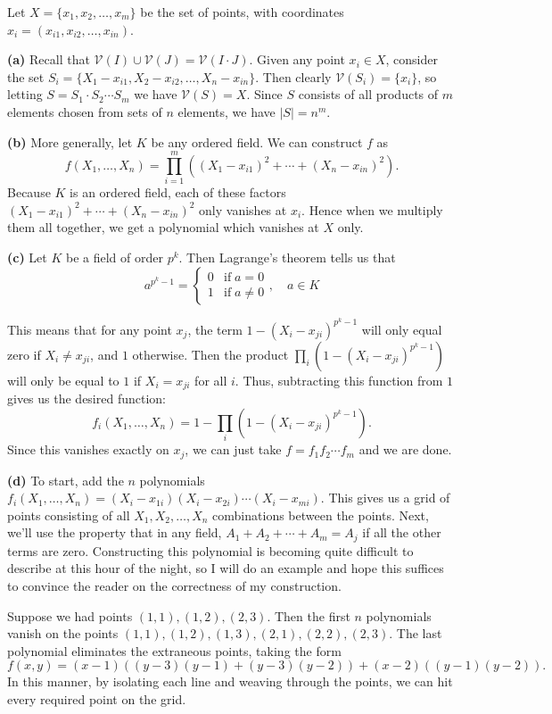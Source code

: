 \documentclass[11pt,letterpaper]{article}
\begin{document}
\begin{changemargin}{1em}{1em}
  Let $X=\{x_1, x_2, \ldots , x_m\}$ be the set of points, with coordinates $x_i = (x_{i1}, x_{i2}, \ldots , x_{in})$.

  \textbf{(a)} Recall that $\mathcal{V}(I)\cup \mathcal{V}(J)=\mathcal{V}(I\cdot J)$. Given any point $x_i\in X$, consider the set $S_i=\{X_1-x_{i 1}, X_2-x_{i 2}, \ldots, X_n - x_{i n}\}$. Then clearly $\mathcal{V}(S_i)=\{x_i\}$, so letting $S=S_1\cdot S_2\cdots S_m$ we have $\mathcal{V}(S)= X$. Since $S$ consists of all products of $m$ elements chosen from sets of $n$ elements, we have $|S|=n^m$.     
  
  \textbf{(b)} More generally, let $K$ be any ordered field. We can construct $f$ as 
  \[
    f(X_1, \ldots , X_n) = \prod\limits_{i=1}^{m}\left((X_1-x_{i1})^2 + \cdots + (X_n - x_{in})^2\right).
  \]  
  Because $K$ is an ordered field, each of these factors $(X_1-x_{i 1})^2+\cdots+(X_n-x_{i n})^2$ only vanishes at $x_i$. Hence when we multiply them all together, we get a polynomial which vanishes at $X$ only.  
  
  \textbf{(c)} Let $K$ be a field of order $p^k$. Then Lagrange's theorem tells us that 
  \[
    a^{p^k-1}=
    \begin{cases}
        0& \mathrm{if}\; a=0\\
        1& \mathrm{if}\; a\neq 0
    \end{cases}
    , \quad a\in K
  \]

  This means that for any point $x_j$, the term $1-(X_i-x_{ji})^{p^k-1}$ will only equal zero if $X_i\neq x_{ji}$, and $1$ otherwise. Then the product $\prod_i (1-(X_i-x_{ji})^{p^k-1})$ will only be equal to $1$ if $X_i=x_{ji}$ for all $i$. Thus, subtracting this function from $1$ gives us the desired function:
  \[
      f_i(X_1, \ldots, X_n) = 1-\prod_i (1-(X_i-x_{ji})^{p^k-1})
  .\]  
  Since this vanishes exactly on $x_j$, we can just take $f=f_1f_2\cdots f_m$ and we are done.  

  \textbf{(d)} To start, add the $n$ polynomials $f_i(X_1, \ldots, X_n)=(X_i-x_{1 i})(X_i-x_{2 i})\cdots (X_i-x_{m i})$. This gives us a grid of points consisting of all $X_1,X_2,\ldots,X_n$ combinations between the points. Next, we'll use the property that in any field, $A_1+A_2+\cdots+A_m=A_j$ if all the other terms are zero. Constructing this polynomial is becoming quite difficult to describe at this hour of the night, so I will do an example and hope this suffices to convince the reader on the correctness of my construction. 
  
  Suppose we had points $(1,1), (1,2), (2,3)$. Then the first $n$ polynomials vanish on the points $(1,1), (1,2), (1,3), (2,1), (2,2), (2,3)$. The last polynomial eliminates the extraneous points, taking the form
  \[
      f(x,y)=(x-1)\left((y-3)(y-1)+(y-3)(y-2)\right)+(x-2)\left((y-1)(y-2)\right)
  .\]   
  In this manner, by isolating each line and weaving through the points, we can hit every required point on the grid.
  
\end{changemargin}
\end{document}
